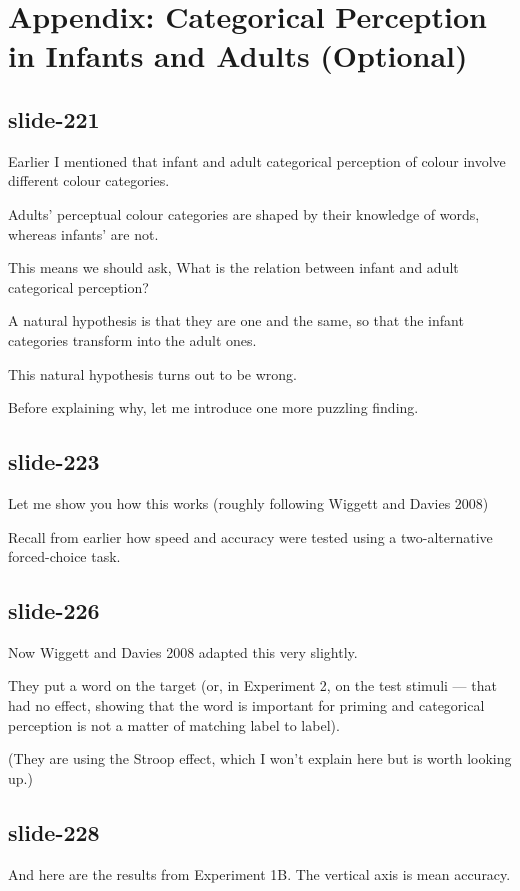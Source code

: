 \documentclass[12pt,\papersize]{extarticle}
\begin{document}
 
\section{Appendix: Categorical Perception in Infants and Adults (Optional)}
 
\subsection{slide-221}
Earlier I mentioned that infant and adult categorical perception of colour involve different colour categories.
 
Adults’ perceptual colour categories are shaped by their knowledge of words, whereas infants’ are not.
 
This means we should ask, What is the relation between infant and adult categorical perception?
 
A natural hypothesis is that they are one and the same, so that the infant categories transform into the adult ones.
 
This natural hypothesis turns out to be wrong.
 
Before explaining why, let me introduce one more puzzling finding.
 
\subsection{slide-223}
Let me show you how this works (roughly following Wiggett and Davies 2008)
 
Recall from earlier how speed and accuracy were tested using a two-alternative forced-choice task.
 
\subsection{slide-226}
Now Wiggett and Davies 2008 adapted this very slightly.
 
They put a word on the target (or, in Experiment 2, on the test stimuli --- that had no effect, showing that the word is important for priming and categorical perception is not a matter of matching label to label).
 
(They are using the Stroop effect, which I won't explain here but is worth looking up.)
 
\subsection{slide-228}
And here are the results from Experiment 1B.  The vertical axis is mean accuracy.
 
\end{document}
